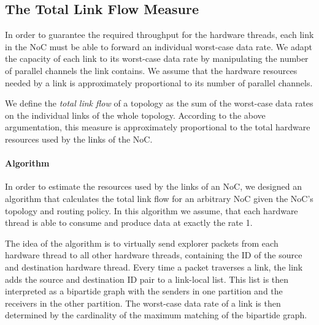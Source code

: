 \subsection{\label{linkFlowMeasure}The Total Link Flow Measure}
In order to guarantee the required throughput for the hardware threads, each link in the NoC must be able to forward an individual worst-case data rate. We adapt the capacity of each link to its worst-case data rate by manipulating the number of parallel channels the link contains. We assume that the hardware resources needed by a link is approximately proportional to its number of parallel channels.

We define the \textit{total link flow} of a topology as the sum of the worst-case data rates on the individual links of the whole topology. According to the above argumentation, this measure is approximately proportional to the total hardware resources used by the links of the NoC. 

\paragraph{\label{linkFlowAlgorithm}Algorithm}
In order to estimate the resources used by the links of an NoC, we designed an algorithm that calculates the total link flow for an arbitrary NoC given the NoC's topology and routing policy. In this algorithm we assume, that each hardware thread is able to consume and produce data at exactly the rate 1.

The idea of the algorithm is to virtually send explorer packets from each hardware thread to all other hardware threads, containing the ID of the source and destination hardware thread. Every time a packet traverses a link, the link adds the source and destination ID pair to a link-local list. This list is then interpreted as a bipartide graph with the senders in one partition 	and the receivers in the other partition. The worst-case data rate of a link is then determined by the cardinality of the maximum matching of the bipartide graph.

